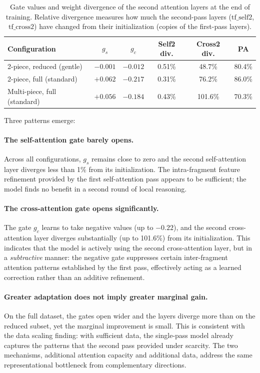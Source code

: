 \begin{table}[h]
\centering
\caption{Gate values and weight divergence of the second attention layers at the end of training. Relative divergence measures how much the second-pass layers ($\text{tf\_self2}$, $\text{tf\_cross2}$) have changed from their initialization (copies of the first-pass layers).}
\label{tab:gates}
\begin{tabular}{lccccc}
\toprule
\textbf{Configuration} & $g_s$ & $g_c$ & \textbf{Self2 div.} & \textbf{Cross2 div.} & \textbf{PA} \\
\midrule
2-piece, reduced (gentle) & $-0.001$ & $-0.012$ & 0.51\% & 48.7\% & 80.4\% \\
2-piece, full (standard) & $+0.062$ & $-0.217$ & 0.31\% & 76.2\% & 86.0\% \\
Multi-piece, full (standard) & $+0.056$ & $-0.184$ & 0.43\% & 101.6\% & 70.3\% \\
\bottomrule
\end{tabular}
\end{table}

Three patterns emerge:

\paragraph{The self-attention gate barely opens.} Across all configurations, $g_s$ remains close to zero and the second self-attention layer diverges less than 1\% from its initialization. The intra-fragment feature refinement provided by the first self-attention pass appears to be sufficient; the model finds no benefit in a second round of local reasoning.

\paragraph{The cross-attention gate opens significantly.} The gate $g_c$ learns to take negative values (up to $-0.22$), and the second cross-attention layer diverges substantially (up to 101.6\%) from its initialization. This indicates that the model is actively using the second cross-attention layer, but in a \textit{subtractive} manner: the negative gate suppresses certain inter-fragment attention patterns established by the first pass, effectively acting as a learned correction rather than an additive refinement.

\paragraph{Greater adaptation does not imply greater marginal gain.} On the full dataset, the gates open wider and the layers diverge more than on the reduced subset, yet the marginal improvement is small. This is consistent with the data scaling finding: with sufficient data, the single-pass model already captures the patterns that the second pass provided under scarcity. The two mechanisms, additional attention capacity and additional data, address the same representational bottleneck from complementary directions.

